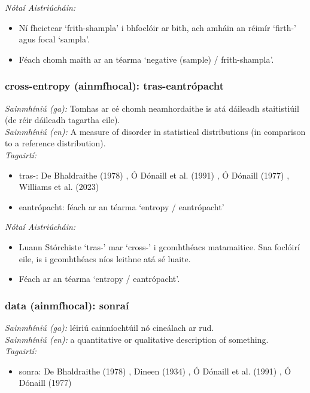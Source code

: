  \noindent \textit{Nótaí Aistriúcháin:}
\begin{itemize}
	\item Ní fheictear `frith-shampla' i bhfoclóir ar bith, ach amháin an réimír `firth-' agus focal `sampla'.
	\item Féach chomh maith ar an téarma `negative (sample) / frith-shampla'.
\end{itemize}


\subsubsection*{cross-entropy (ainmfhocal): tras-eantrópacht}
 \noindent \textit{Sainmhíniú (ga):} Tomhas ar cé chomh neamhordaithe is atá dáileadh staitistiúil (de réir dáileadh tagartha eile).
\\
 \noindent \textit{Sainmhíniú (en):} A measure of disorder in statistical distributions (in comparison to a reference distribution).
\\
 \noindent \textit{Tagairtí:}
\begin{itemize}
	\item tras-: De Bhaldraithe (1978) \cite{de-bhaldraithe}, Ó Dónaill et al. (1991) \cite{focloir-beag}, Ó Dónaill (1977) \cite{odonaill}, Williams et al. (2023) \cite{storchiste}
	\item eantrópacht: féach ar an téarma `entropy / eantrópacht'
\end{itemize}

 \noindent \textit{Nótaí Aistriúcháin:}
\begin{itemize}
	\item Luann Stórchiste `tras-' mar `cross-' i gcomhthéacs matamaitice. Sna foclóirí eile, is i gcomhthéacs níos leithne atá sé luaite.
	\item Féach ar an téarma `entropy / eantrópacht'.
\end{itemize}


\subsubsection*{data (ainmfhocal): sonraí}
 \noindent \textit{Sainmhíniú (ga):} léiriú cainníochtúil nó cineálach ar rud.
\\
 \noindent \textit{Sainmhíniú (en):} a quantitative or qualitative description of something.
\\
 \noindent \textit{Tagairtí:}
\begin{itemize}
	\item sonra: De Bhaldraithe (1978) \cite{de-bhaldraithe}, Dineen (1934) \cite{dineen}, Ó Dónaill et al. (1991) \cite{focloir-beag}, Ó Dónaill (1977) \cite{odonaill}
\end{itemize}

